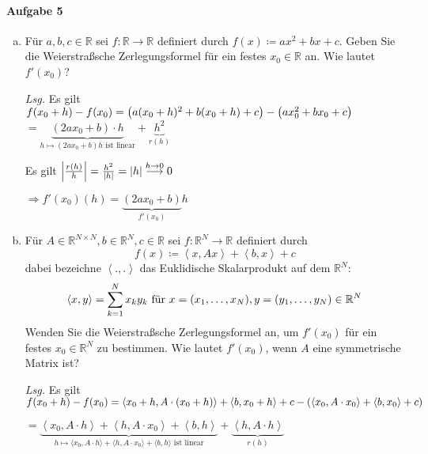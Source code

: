 \documentclass{scrreprt}
\begin{document}
\paragraph{Aufgabe 5}
\begin{enumerate}[a)]
\item Für $a, b, c \in \mathbb{R}$ sei $f \colon \mathbb{R} \to \mathbb{R}$
  definiert durch $f(x) \coloneqq ax^2 + bx + c$.
  Geben Sie die Weierstraßsche Zerlegungsformel für ein festes
  $x_0 \in \mathbb{R}$ an.
  Wie lautet $f'(x_0)$?

  \textit{Lsg.}
  Es gilt $f(x_0 + h) - f(x_0) = \qty(a(x_0 + h)^2 + b(x_0 + h) + c)
  - \qty(ax_0^2 + bx_0 + c)$
  $= \underset{h \mapsto (2ax_0 + b)h  \text{ ist linear}}{\underbrace{(2ax_0 + b) \cdot h}} + \underset{r(h)}{\underbrace{h^2}}$

  Es gilt $\abs{\frac{r(h)}{h}} = \frac{h^2}{\abs{h}} = \abs{h} \overset{h \to 0}\longrightarrow 0$

  $\Rightarrow f'(x_0)(h) = \underset{f'(x_0)}{\underbrace{(2ax_0 + b)}} h$

\item Für $A \in \mathbb{R}^{N \times N}, b \in \mathbb{R}^N, c \in \mathbb{R}$ sei
  $f \colon \mathbb{R}^N \to \mathbb{R}$ definiert durch
  \[
    f(x) \coloneqq \left\langle x, Ax \right\rangle + \left\langle b, x \right\rangle + c
  \]
  dabei bezeichne $\left\langle ., . \right\rangle$ das Euklidische Skalarprodukt auf dem $\mathbb{R}^N \colon$
  \[
    \left\langle x, y \right\rangle = \sum_{k = 1}^N x_k y_k \text{ für } x = \qty(x_1, \ldots, x_N), y = \qty(y_1, \ldots, y_N) \in \mathbb{R}^N
  \]
  Wenden Sie die Weierstraßsche Zerlegungsformel an, um $f'(x_0)$ für ein festes
  $x_0 \in \mathbb{R}^N$ zu bestimmen.
  Wie lautet $f'(x_0)$, wenn $A$ eine symmetrische Matrix ist?

  \textit{Lsg.} Es gilt
  $f(x_0 + h) - f(x_0) = \left\langle x_0 + h, A \cdot (x_0 + h) \right\rangle
  + \left\langle b, x_0 + h \right\rangle + c -
  \qty(\left\langle x_0, A \cdot x_0 \right\rangle + \left\langle b, x_0 \right\rangle + c)$

  $= \underset{
    h \mapsto \langle x_0, A \cdot h \rangle + \langle h, A \cdot x_0 \rangle + \langle b, h \rangle \text{ ist linear}
  }{\underbrace{\left\langle x_0, A \cdot h \right\rangle + \left\langle h, A \cdot x_0 \right\rangle
  + \left\langle b, h \right\rangle}} +
  \underset{r(h)}{\underbrace{\left\langle h, A \cdot h \right\rangle}}$



\end{enumerate}
\end{document}
